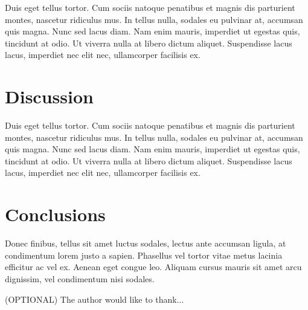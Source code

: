\documentclass[12pt, twocolumn]{revtex4}    %
\begin{document}
Duis eget tellus tortor. Cum sociis natoque penatibus et magnis dis parturient montes, nascetur ridiculus mus. In tellus nulla, sodales eu pulvinar at, accumsan quis magna. Nunc sed lacus diam. Nam enim mauris, imperdiet ut egestas quis, tincidunt at odio. Ut viverra nulla at libero dictum aliquet. Suspendisse lacus lacus, imperdiet nec elit nec, ullamcorper facilisis ex. 

\section{Discussion} 

Duis eget tellus tortor. Cum sociis natoque penatibus et magnis dis parturient montes, nascetur ridiculus mus. In tellus nulla, sodales eu pulvinar at, accumsan quis magna. Nunc sed lacus diam. Nam enim mauris, imperdiet ut egestas quis, tincidunt at odio. Ut viverra nulla at libero dictum aliquet. Suspendisse lacus lacus, imperdiet nec elit nec, ullamcorper facilisis ex. 

\section{Conclusions}
 
Donec finibus, tellus sit amet luctus sodales, lectus ante accumsan ligula, at condimentum lorem justo a sapien. Phasellus vel tortor vitae metus lacinia efficitur ac vel ex. Aenean eget congue leo. Aliquam cursus mauris sit amet arcu dignissim, vel condimentum nisi sodales. 

\begin{acknowledgments}
(OPTIONAL) The author would like to thank...
\end{acknowledgments}



\end{document}
